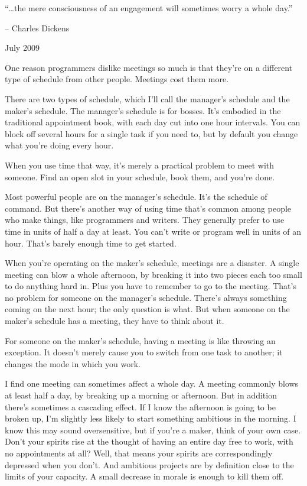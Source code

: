 \documentclass[12pt]{book}
\begin{document}
``\ldots the mere consciousness of an engagement will sometimes worry a
whole day.''

-- Charles Dickens

July 2009

One reason programmers dislike meetings so much is that they're on a
different type of schedule from other people. Meetings cost them more.

There are two types of schedule, which I'll call the manager's schedule
and the maker's schedule. The manager's schedule is for bosses. It's
embodied in the traditional appointment book, with each day cut into one
hour intervals. You can block off several hours for a single task if you
need to, but by default you change what you're doing every hour.

When you use time that way, it's merely a practical problem to meet with
someone. Find an open slot in your schedule, book them, and you're done.

Most powerful people are on the manager's schedule. It's the schedule of
command. But there's another way of using time that's common among
people who make things, like programmers and writers. They generally
prefer to use time in units of half a day at least. You can't write or
program well in units of an hour. That's barely enough time to get
started.

When you're operating on the maker's schedule, meetings are a disaster.
A single meeting can blow a whole afternoon, by breaking it into two
pieces each too small to do anything hard in. Plus you have to remember
to go to the meeting. That's no problem for someone on the manager's
schedule. There's always something coming on the next hour; the only
question is what. But when someone on the maker's schedule has a
meeting, they have to think about it.

For someone on the maker's schedule, having a meeting is like throwing
an exception. It doesn't merely cause you to switch from one task to
another; it changes the mode in which you work.

I find one meeting can sometimes affect a whole day. A meeting commonly
blows at least half a day, by breaking up a morning or afternoon. But in
addition there's sometimes a cascading effect. If I know the afternoon
is going to be broken up, I'm slightly less likely to start something
ambitious in the morning. I know this may sound oversensitive, but if
you're a maker, think of your own case. Don't your spirits rise at the
thought of having an entire day free to work, with no appointments at
all? Well, that means your spirits are correspondingly depressed when
you don't. And ambitious projects are by definition close to the limits
of your capacity. A small decrease in morale is enough to kill them off.
\end{document}
